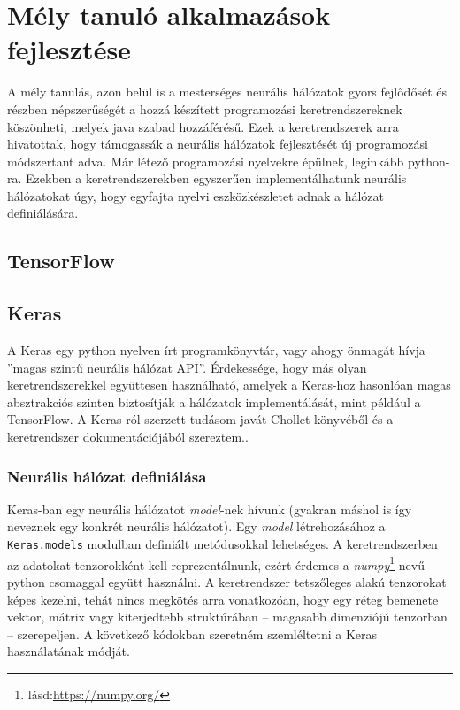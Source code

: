 \chapter{Mély tanuló alkalmazások fejlesztése}
A mély tanulás, azon belül is a mesterséges neurális hálózatok gyors fejlődősét és részben népszerűségét a hozzá készített programozási keretrendszereknek köszönheti, melyek java szabad hozzáférésű. Ezek a keretrendszerek arra hivatottak, hogy támogassák a neurális hálózatok fejlesztését új programozási módszertant adva. Már létező programozási nyelvekre épülnek, leginkább python-ra. Ezekben a keretrendszerekben egyszerűen implementálhatunk neurális hálózatokat úgy, hogy egyfajta nyelvi eszközkészletet adnak a hálózat definiálására.

\section{TensorFlow}

\section{Keras}

A Keras egy python nyelven írt programkönyvtár, vagy ahogy önmagát hívja ''magas szintű neurális hálózat API''\cite{web:Keras}. Érdekessége, hogy más olyan keretrendszerekkel együttesen használható, amelyek a Keras-hoz hasonlóan magas absztrakciós szinten biztosítják a hálózatok implementálását, mint például a TensorFlow. A Keras-ról szerzett tudásom javát Chollet könyvéből és a keretrendszer dokumentációjából szereztem.\cite{Chollet}\cite{web:Keras}.

\subsection{Neurális hálózat definiálása}

Keras-ban egy neurális hálózatot \emph{model}-nek hívunk (gyakran máshol is így neveznek egy konkrét neurális hálózatot). Egy \emph{model} létrehozásához a \verb|Keras.models| modulban definiált metódusokkal lehetséges. A keretrendszerben az adatokat tenzorokként kell reprezentálnunk, ezért érdemes a \emph{numpy}\footnote{lásd:\url{https://numpy.org/}} nevű python csomaggal együtt használni. A keretrendszer tetszőleges alakú tenzorokat képes kezelni, tehát nincs megkötés arra vonatkozóan, hogy egy réteg bemenete vektor, mátrix vagy kiterjedtebb struktúrában -- magasabb dimenziójú tenzorban -- szerepeljen. A következő kódokban szeretném szemléltetni a Keras használatának módját.

